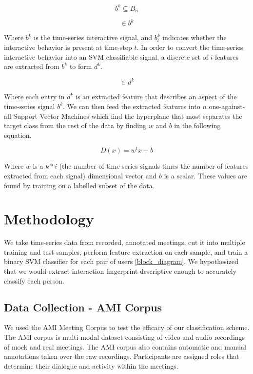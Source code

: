 \documentclass[conference]{IEEEtran}
\begin{document}
\begin{equation}
    b^k \subseteq B_n
\end{equation}

\begin{equation}
    [b^k_{t=0} ... b^k_{t=n}] \in b^k
\end{equation}

Where $b^k$ is the time-series interactive signal, and $b^k_t$ indicates whether the interactive behavior is present at time-step $t$. In order to convert the time-series interactive behavior into an SVM classifiable signal, a discrete set of $i$ features are extracted from $b^k$ to form $d^k$.

\begin{equation}
    [d^k_0 ... d^k_i] \in d^k
\end{equation}

Where each entry in $d^k$ is an extracted feature that describes an aspect of the time-series signal $b^k$. We can then feed the extracted features into $n$ one-against-all Support Vector Machines which find the hyperplane that most separates the target class from the rest of the data by finding $w$ and $b$ in the following equation. \cite{abe_analysis_2003}

\begin{equation}
    D(x) = w^tx + b
\end{equation}

Where $w$ is a $k*i$ (the number of time-series signals times the number of features extracted from each signal) dimensional vector and $b$ is a scalar. These values are found by training on a labelled subset of the data. 


\section{Methodology}
We take time-series data from recorded, annotated meetings, cut it into multiple training and test samples, perform feature extraction on each sample, and train a binary SVM classifier for each pair of users \ref{block_diagram}. We hypothesized that we would extract interaction fingerprint descriptive enough to accurately classify each person. 


\subsection{Data Collection - AMI Corpus}
We used the AMI Meeting Corpus \cite{kilgour_ami_nodate} to test the efficacy of our classification scheme. The AMI corpus is multi-modal dataset consisting of video and audio recordings of mock and real meetings. The AMI corpus also contains automatic and manual annotations taken over the raw recordings. Participants are assigned roles that determine their dialogue and activity within the meetings.
\end{document}
